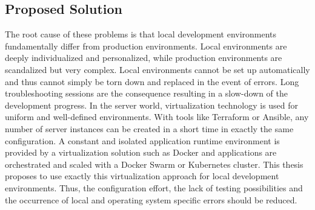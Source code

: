         \subsection{Proposed Solution}
        The root cause of these problems is that local development environments fundamentally differ from production environments. Local environments are deeply individualized and personalized, while production environments are scandalized but very complex. Local environments cannot be set up automatically and thus cannot simply be torn down and replaced in the event of errors. Long troubleshooting sessions are the consequence resulting in a slow-down of the development progress.\newline
        In the server world, virtualization technology is used for uniform and well-defined environments. With tools like Terraform or Ansible, any number of server instances can be created in a short time in exactly the same configuration. A constant and isolated application runtime environment is provided by a virtualization solution such as Docker and applications are orchestrated and scaled with a Docker Swarm or Kubernetes cluster.\newline
        This thesis proposes to use exactly this virtualization approach for local development environments. Thus, the configuration effort, the lack of testing possibilities and the occurrence of local and operating system specific errors should be reduced.
